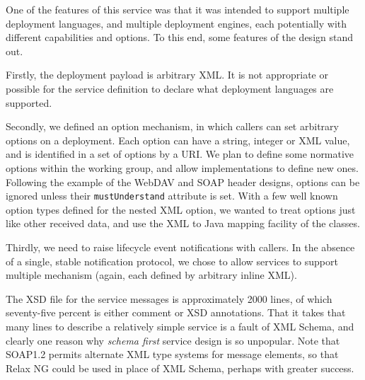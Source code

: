 One of the features of this service was that it was intended to
support multiple deployment languages, and multiple deployment
engines, each potentially with different capabilities and options. To
this end, some features of the design stand out.

Firstly, the deployment payload is arbitrary XML. It is not
appropriate or possible for the service definition to declare what
deployment languages are supported.

Secondly, we defined an option mechanism, in which callers can set
arbitrary options on a deployment. Each option can have a string,
integer or XML value, and is identified in a set of options by a
URI. We plan to define some normative options within the working
group, and allow implementations to define new ones.  Following the
example of the WebDAV and SOAP header designs, options can be ignored
unless their \verb|mustUnderstand| attribute is set. With a few well
known option types defined for the nested XML option, we wanted
 to treat options just like other received data, and use the XML to Java
mapping facility of the classes. 

Thirdly, we need to raise lifecycle event notifications with
callers. In the absence of a single, stable notification protocol, we
chose to allow services to support multiple mechanism (again, each
defined by arbitrary inline XML).

The XSD file for the service messages is approximately 2000 lines, of
which seventy-five percent is either comment or XSD annotations. That it
takes that many lines to describe a relatively simple service is a
fault of  XML Schema, and clearly one reason why \emph{schema first}
service design is so unpopular. Note that SOAP1.2 permits alternate XML
type systems for message elements, so that Relax NG \cite{spec:RelaxNG}
could be used in place of XML Schema, perhaps with greater success. 


